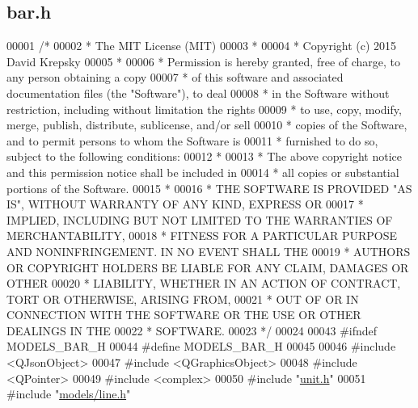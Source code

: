 \hypertarget{bar_8h_source}{}\subsection{bar.\+h}
\label{bar_8h_source}

\begin{DoxyCode}
00001 \textcolor{comment}{/*}
00002 \textcolor{comment}{ * The MIT License (MIT)}
00003 \textcolor{comment}{ *}
00004 \textcolor{comment}{ * Copyright (c) 2015 David Krepsky}
00005 \textcolor{comment}{ *}
00006 \textcolor{comment}{ * Permission is hereby granted, free of charge, to any person obtaining a copy}
00007 \textcolor{comment}{ * of this software and associated documentation files (the "Software"), to deal}
00008 \textcolor{comment}{ * in the Software without restriction, including without limitation the rights}
00009 \textcolor{comment}{ * to use, copy, modify, merge, publish, distribute, sublicense, and/or sell}
00010 \textcolor{comment}{ * copies of the Software, and to permit persons to whom the Software is}
00011 \textcolor{comment}{ * furnished to do so, subject to the following conditions:}
00012 \textcolor{comment}{ *}
00013 \textcolor{comment}{ * The above copyright notice and this permission notice shall be included in}
00014 \textcolor{comment}{ * all copies or substantial portions of the Software.}
00015 \textcolor{comment}{ *}
00016 \textcolor{comment}{ * THE SOFTWARE IS PROVIDED "AS IS", WITHOUT WARRANTY OF ANY KIND, EXPRESS OR}
00017 \textcolor{comment}{ * IMPLIED, INCLUDING BUT NOT LIMITED TO THE WARRANTIES OF MERCHANTABILITY,}
00018 \textcolor{comment}{ * FITNESS FOR A PARTICULAR PURPOSE AND NONINFRINGEMENT. IN NO EVENT SHALL THE}
00019 \textcolor{comment}{ * AUTHORS OR COPYRIGHT HOLDERS BE LIABLE FOR ANY CLAIM, DAMAGES OR OTHER}
00020 \textcolor{comment}{ * LIABILITY, WHETHER IN AN ACTION OF CONTRACT, TORT OR OTHERWISE, ARISING FROM,}
00021 \textcolor{comment}{ * OUT OF OR IN CONNECTION WITH THE SOFTWARE OR THE USE OR OTHER DEALINGS IN THE}
00022 \textcolor{comment}{ * SOFTWARE.}
00023 \textcolor{comment}{ */}
00024 
00043 \textcolor{preprocessor}{#ifndef MODELS\_BAR\_H}
00044 \textcolor{preprocessor}{#define MODELS\_BAR\_H}
00045 
00046 \textcolor{preprocessor}{#include <QJsonObject>}
00047 \textcolor{preprocessor}{#include <QGraphicsObject>}
00048 \textcolor{preprocessor}{#include <QPointer>}
00049 \textcolor{preprocessor}{#include <complex>}
00050 \textcolor{preprocessor}{#include "\hyperlink{unit_8h}{unit.h}"}
00051 \textcolor{preprocessor}{#include "\hyperlink{line_8h}{models/line.h}"}

\end{DoxyCode}
